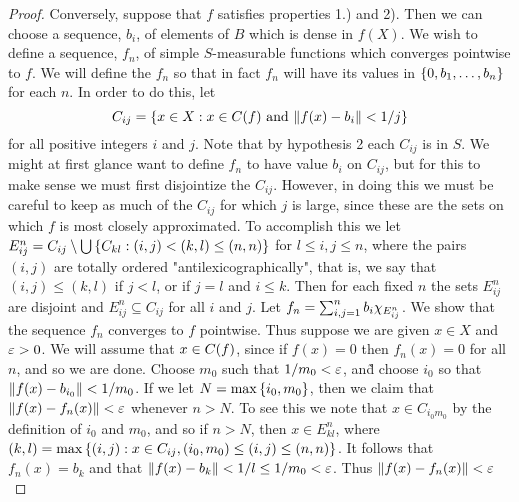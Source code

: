 \begin{proof}
Conversely, suppose that $f$ satisfies properties 1.) and 2). Then we can choose a sequence, $b_i$, of elements of $B$ which is dense in $f(X)$. We wish to define a sequence, $f_n$, of simple $S$-measurable functions which converges pointwise to $f$. We will define the $f_n$ so that in fact $f_n$ will have its values in $\left\{0, b_1, \dots, b_n\right\}$ for each $n$. In order to do this, let $$C_{ij}=\left\{x \in X: x\in C(f)\text{ and }\norm{f(x)-b_i}<1/j\right\}$$ for all positive integers $i$ and $j$. Note that by hypothesis 2 each $C_{i j}$ is in $S$. We might at first glance want to define $f_n$ to have value $b_i$ on $C_{i j}$, but for this to make sense we must first disjointize the $C_{i j}$. However, in doing this we must be careful to keep as much of the $C_{i j}$ for which $j$ is large, since these are the sets on which $f$ is most closely approximated. To accomplish this we let $E_{i j}^n=C_{i j}\setminus\bigcup\left\{C_{k l}:(i,j)<(k,l)\leq(n, n)\right\}$ for $l \leq i, j \leq n$, where the pairs $(i, j)$ are totally ordered "antilexicographically", that is, we say that $(i, j) \leq(k, l)$ if $j<l$, or if $j=l$ and $i \leq k$. Then for each fixed $n$ the sets $E_{i j}^n$ are disjoint and $E_{i j}^n \subseteq C_{i j}$ for all $i$ and $j$. Let $f_n=\sum_{i, j=1}^n b_i \chi_{E_{i j}^n}$. We show that the sequence $f_n$ converges to $f$ pointwise. Thus suppose we are given $x \in X$ and $\varepsilon>0$. We will assume that $x \in C(f)$, since if $f(x)=0$ then $f_n(x)=0$ for all $n$, and so we are done. Choose $m_0$ such that $1/m_0<\varepsilon$, and̃ choose $i_0$ so that $\norm{f(x)-b_{i_0}}<1/m_0$. If we let $N=\max\left\{i_0, m_0\right\}$, then we claim that $\norm{f(x)-f_n(x)}<\varepsilon$ whenever $n>N$. To see this we note that $x\in C_{i_0m_0}$ by the definition of $i_0$ and $m_0$, and so if $n>N$, then $x \in E^n_{kl}$, where $(k, l)=\max\left\{(i, j): x \in C_{i j},(i_0, m_0) \leq(i, j) \leq(n, n)\right\}$. It follows that $f_n(x)=b_k$ and that $\norm{f(x)-b_k}<1/l \leq 1/m_0<\varepsilon$. Thus $\norm{f(x)-f_n(x)}<\varepsilon$
\end{proof}

